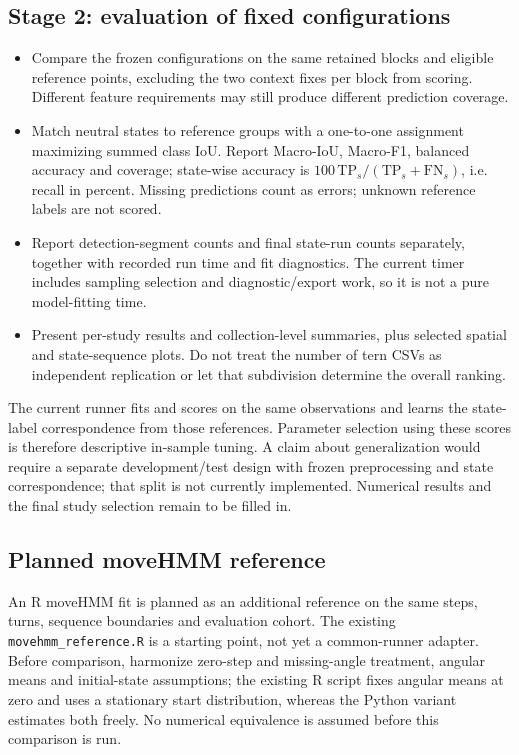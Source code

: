 \subsection{Stage 2: evaluation of fixed configurations}
\label{subsec:seg-method-comparison}
\begin{itemize}
    \item Compare the frozen configurations on the same retained blocks and eligible reference points, excluding the two context fixes per block from scoring.
    Different feature requirements may still produce different prediction coverage.
    \item Match neutral states to reference groups with a one-to-one assignment maximizing summed class IoU.
    Report Macro-IoU, Macro-F1, balanced accuracy and coverage; state-wise accuracy is $100\,\mathrm{TP}_s/(\mathrm{TP}_s+\mathrm{FN}_s)$, i.e. recall in percent.
    Missing predictions count as errors; unknown reference labels are not scored.
    \item Report detection-segment counts and final state-run counts separately, together with recorded run time and fit diagnostics.
    The current timer includes sampling selection and diagnostic/export work, so it is not a pure model-fitting time.
    \item Present per-study results and collection-level summaries, plus selected spatial and state-sequence plots.
    Do not treat the number of tern CSVs as independent replication or let that subdivision determine the overall ranking.
\end{itemize}

The current runner fits and scores on the same observations and learns the state-label correspondence from those references.
Parameter selection using these scores is therefore descriptive in-sample tuning.
A claim about generalization would require a separate development/test design with frozen preprocessing and state correspondence; that split is not currently implemented.
Numerical results and the final study selection remain to be filled in.

\subsection{Planned moveHMM reference}
\label{subsec:seg-movehmm-reference}
An R moveHMM fit is planned as an additional reference on the same steps, turns, sequence boundaries and evaluation cohort.
The existing \texttt{movehmm\_\allowbreak{}reference.R} is a starting point, not yet a common-runner adapter.
Before comparison, harmonize zero-step and missing-angle treatment, angular means and initial-state assumptions; the existing R script fixes angular means at zero and uses a stationary start distribution, whereas the Python variant estimates both freely.
No numerical equivalence is assumed before this comparison is run.

